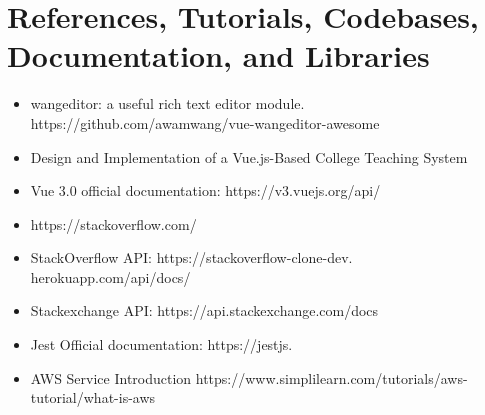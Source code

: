 \documentclass[11pt]{article}
\begin{document}
\section{References, Tutorials, Codebases, Documentation, and Libraries}  
\begin{itemize}
    \item \noindent [1] wangeditor: a useful rich text editor module. https://github.com/awamwang/vue-wangeditor-awesome
    \item \noindent [2] Design and Implementation of a Vue.js-Based College Teaching System
    \item \noindent [3] Vue 3.0 official documentation: https://v3.vuejs.org/api/
    \item \noindent [4] https://stackoverflow.com/
    \item \noindent [5] StackOverflow API: https://stackoverflow-clone-dev. herokuapp.com/api/docs/
    \item \noindent [6] Stackexchange API: https://api.stackexchange.com/docs
    \item \noindent [7] Jest Official documentation:  https://jestjs.
    \item \noindent [8] AWS Service Introduction https://www.simplilearn.com/tutorials/aws-tutorial/what-is-aws

\end{itemize}



 
\end{document}
